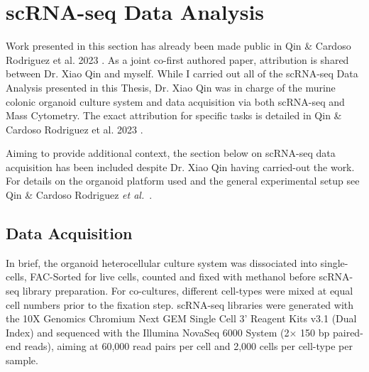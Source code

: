 \newpage
\section{scRNA-seq Data Analysis}

Work presented in this section has already been made public in Qin \& Cardoso Rodriguez et al. 2023 \cite{cardoso_rodriguez_single-cell_2023}. As a joint co-first authored paper, attribution is shared between Dr. Xiao Qin and myself. While I carried out all of the scRNA-seq Data Analysis presented in this Thesis, Dr. Xiao Qin was in charge of the murine colonic organoid culture system and data acquisition via both scRNA-seq and Mass Cytometry. The exact attribution for specific tasks is detailed in Qin \& Cardoso Rodriguez et al. 2023 \cite{cardoso_rodriguez_single-cell_2023}. 

Aiming to provide additional context, the section below on scRNA-seq data acquisition has been included despite Dr. Xiao Qin having carried-out the work. For details on the organoid platform used and the general experimental setup see Qin \& Cardoso Rodriguez \emph{et al.}~\cite{cardoso_rodriguez_single-cell_2023}.





\subsection{Data Acquisition}

In brief, the organoid heterocellular culture system was dissociated into single-cells, FAC-Sorted for live cells, counted and fixed with methanol before scRNA-seq library preparation. For co-cultures, different cell-types were mixed at equal cell numbers prior to the fixation step. scRNA-seq libraries were generated with the 10X Genomics Chromium Next GEM Single Cell 3' Reagent Kits v3.1 (Dual Index) and sequenced with the Illumina NovaSeq 6000 System (2$\times$ 150 bp paired-end reads), aiming at 60,000 read pairs per cell and 2,000 cells per cell-type per sample.

